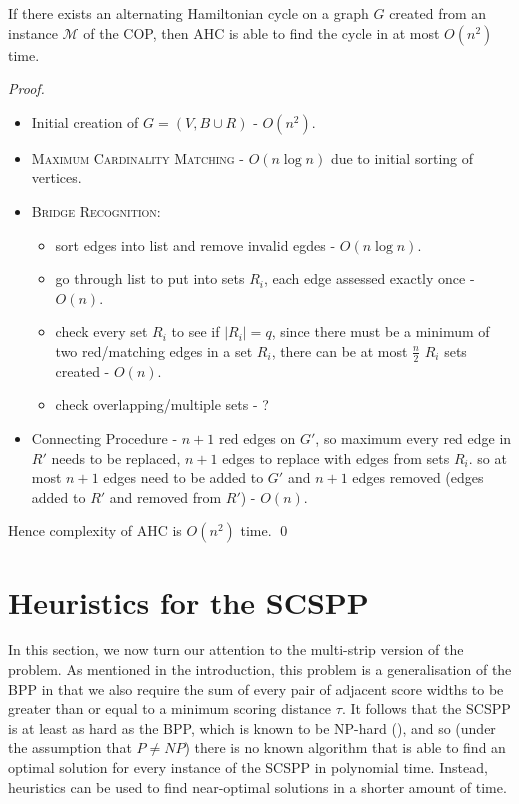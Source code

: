 \documentclass[oribibl]{llncs}
\begin{document}
\begin{theorem}
	\label{thm:copsoln}
	If there exists an alternating Hamiltonian cycle on a graph $G$ created from an instance $\mathcal{M}$ of the COP, then AHC is able to find the cycle in at most $O(n^2)$ time.
\end{theorem}
\begin{proof}
	\begin{itemize}
		\item Initial creation of $G = (V, B \cup R)$ - $O(n^2)$.
		\item \textsc{Maximum Cardinality Matching} - $O(n\log n)$ due to initial sorting of vertices.
		\item \textsc{Bridge Recognition}:
		\begin{itemize}
			\item sort edges into list and remove invalid egdes - $O(n \log n)$.
			\item go through list to put into sets $R_i$, each edge assessed exactly once - $O(n)$.
			\item check every set $R_i$ to see if $|R_i| = q$, since there must be a minimum of two red/matching edges in a set $R_i$, there can be at most $\frac{n}{2}$ $R_i$ sets created - $O(n)$.
			\item check overlapping/multiple sets - ?
		\end{itemize}	
		\item Connecting Procedure - $n+1$ red edges on $G'$, so maximum every red edge in $R'$ needs to be replaced, $n+1$ edges to replace with edges from sets $R_i$. so at most $n+1$ edges need to be added to $G'$ and $n+1$ edges removed (edges added to $R'$ and removed from $R'$) - $O(n)$.
	\end{itemize}
	Hence complexity of AHC is $O(n^2)$ time.
	\qed
\end{proof}


\section{Heuristics for the SCSPP}
\label{sec:scsppsoln}

In this section, we now turn our attention to the multi-strip version of the problem. As mentioned in the introduction, this problem is a generalisation of the BPP in that we also require the sum of every pair of adjacent score widths to be greater than or equal to a minimum scoring distance $\tau$. It follows that the SCSPP is at least as hard as the BPP, which is known to be NP-hard (\citealp{garey1979}), and so (under the assumption that $P \neq NP$) there is no known algorithm that is able to find an optimal solution for every instance of the SCSPP in polynomial time. Instead, heuristics can be used to find near-optimal solutions in a shorter amount of time.
\end{document}
